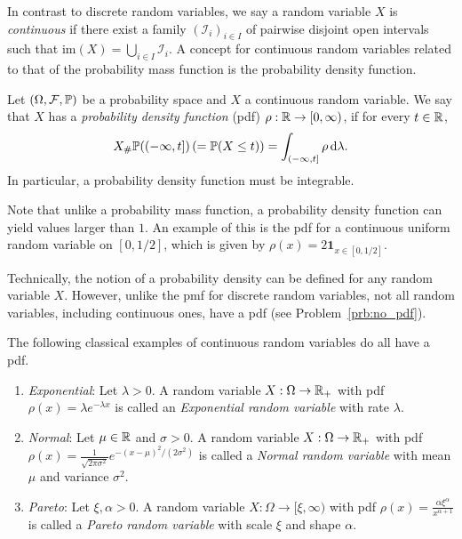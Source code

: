 In contrast to discrete random variables, we say a random variable $X$ is \emph{continuous} if there exist a family  $(\mathcal{I}_i)_{i \in I}$ of pairwise disjoint open intervals such that $\mathrm{im}(X) = \bigcup_{i \in I} \mathcal{I}_i$.
A concept for continuous random variables related to that of the probability mass function is the probability density function. 

\begin{definition}\label{def:pdf}
Let $(\Omega, \mathcal F, \mathbb{P})$ be a probability space and $X$ a continuous random variable. We say that $X$ has a \emph{probability density function} (pdf) $\rho : \mathbb R \to [0,\infty)$, if for every $t \in \mathbb R$,
\[
	X_\# \mathbb P((-\infty , t]) \, (= \mathbb P(X \le t)) = \int_{(-\infty,t]} \rho \, \mathrm{d} \lambda.
\]
In particular, a probability density function must be integrable.
\end{definition}

Note that unlike a probability mass function, a probability density function can yield values larger than $1$. An example of this is the pdf for a continuous uniform random variable on $[0,1/2]$, which is given by $\rho(x) = 2 \mathbf{1}_{x \in [0,1/2]}$.

Technically, the notion of a probability density can be defined for any random variable $X$. However, unlike the pmf for discrete random variables, not all random variables, including continuous ones, have a pdf (see Problem~\ref{prb:no_pdf}).

The following classical examples of continuous random variables do all have a pdf.

\begin{example}\hfill
\begin{enumerate}[label=(\alph*)]
\item \textit{Exponential}: Let $\lambda > 0$. A random variable $X : \Omega \to \mathbb R_+$ with pdf $\rho(x) = \lambda e^{-\lambda x}$ is called an \emph{Exponential random variable} with rate $\lambda$.
\item \textit{Normal}: Let $\mu \in \mathbb R$ and $\sigma > 0$. A random variable $X : \Omega \to \mathbb R_+$ with pdf $\rho(x) = \frac{1}{\sqrt{2 \pi \sigma^2}} e^{-(x - \mu)^2/(2\sigma^2)}$ is called a \emph{Normal random variable} with mean $\mu$ and variance $\sigma^2$.
\item \textit{Pareto}: Let $\xi, \alpha > 0$. A random variable $X : \Omega \to [\xi, \infty)$ with pdf $\rho(x) = \frac{\alpha \xi^\alpha}{x^{\alpha +1}}$ is called a \emph{Pareto random variable} with scale $\xi$ and shape $\alpha$.
\end{enumerate} 
\end{example}



